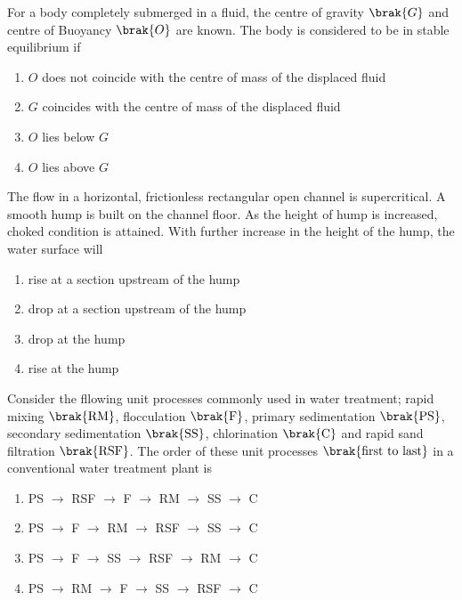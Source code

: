     \item For a body completely submerged in a fluid, the centre of gravity $\brak{G}$ and centre of Buoyancy $\brak{O}$ are known. The body is considered to be in stable equilibrium if
	\hfill{}

	\begin{enumerate}
		\item $O$ does not coincide with the centre of mass of the displaced fluid
		\item $G$ coincides with the centre of mass of the displaced fluid
		\item $O$ lies below $G$
		\item $O$ lies above $G$
	\end{enumerate}

    \item The flow in a horizontal, frictionless rectangular open channel is supercritical. A smooth hump is built on the channel floor. As the height of hump is increased, choked condition is attained. With further increase in the height of the hump, the water surface will
	\hfill{}

	\begin{enumerate}
		\item rise at a section upstream of the hump
		\item drop at a section upstream of the hump
		\item drop at the hump
		\item rise at the hump
	\end{enumerate}

    \item Consider the fllowing unit processes commonly used in water treatment; rapid mixing $\brak{\text{RM}}$, flocculation $\brak{\text{F}}$, primary sedimentation $\brak{\text{PS}}$, secondary sedimentation $\brak{\text{SS}}$, chlorination $\brak{\text{C}}$ and rapid sand filtration $\brak{\text{RSF}}$. The order of these unit processes $\brak{\text{first to last}}$ in a conventional water treatment plant is
	\hfill{}
	\begin{enumerate}
		\item PS $\to$ RSF $\to$ F $\to$ RM $\to$ SS $\to$ C
		\item PS $\to$ F $\to$ RM $\to$ RSF $\to$ SS $\to$ C
		\item PS $\to$ F $\to$ SS $\to$ RSF $\to$ RM $\to$ C
		\item PS $\to$ RM $\to$ F $\to$ SS $\to$ RSF $\to$ C
	\end{enumerate}


